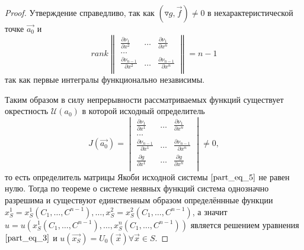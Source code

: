 \documentclass[a4paper, 12pt]{article}
\begin{document}
\begin{proof}
        Утверждение справедливо, так как $ (\triangledown g, \overrightarrow{f}) \neq 0$ в нехарактеристической точке $\overrightarrow{a_0}$ и
        \begin{equation*}
            rank
            \begin{Vmatrix}
                \frac{\partial \nu_1}{\partial x^2} & \dots & \frac{\partial \nu_1}{\partial x^n}               \\
                \dots                                                                                                              \\
                \frac{\partial \nu_{n - 1}}{\partial x^2}  & \dots & \frac{\partial \nu_{n - 1}}{\partial x^n}\\
            \end{Vmatrix} = n - 1
        \end{equation*}
        так как первые интегралы функционально независимы.

        Таким образом в силу непрерывности рассматриваемых функций существует окрестность $\mathcal{U}(a_0)$ в которой исходный определитель
        \begin{equation*}
            J(\overrightarrow{a_0}) =
            \begin{vmatrix}
                \frac{\partial \nu_1}{\partial x^1} & \dots & \frac{\partial \nu_1}{\partial x^n}             \\
                \dots                                                                                         \\
                \frac{\partial \nu_{n - 1}}{\partial x^1} & \dots & \frac{\partial \nu_{n - 1}}{\partial x^n} \\
                \frac{\partial g}{\partial x^1} & \dots & \frac{\partial g}{\partial x^n}                     \\
            \end{vmatrix} \neq 0,
        \end{equation*}
        то есть определитель матрицы Якоби исходной системы $\eqref{part_eq_5}$ не равен нулю. Тогда по теореме о системе неявных функций система однозначно разрешима и существуют единственным образом определённные функции $x^1_S = x^1_S(C_1, \dots, C^{n - 1}), \dots, x^2_S = x^2_S(C_1, \dots, C^{n - 1})$, а значит $u = u(x^1_S(C_1, \dots, C^{n - 1}), \dots, x^n_S(C_1, \dots, C^{n - 1}))$ является решением уравнения $\eqref{part_eq_3}$ и $u(\overrightarrow{x_S}) = U_0(\overrightarrow{x}) \forall \overrightarrow{x} \in S$.

    \end{proof}
\end{document}
